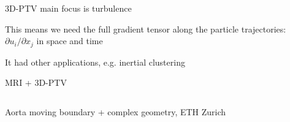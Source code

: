     
\begin{frame}[label=app-13]{3D-PTV main focus is turbulence}
    \begin{cardTiny} 
    This means we need  the \alert{full gradient tensor} along the particle trajectories:
    $\partial u_{i}/\partial x_{j}$ in space and time
    \end{cardTiny}
    \begin{multicols}{2}
    \centering
    \end{multicols}
    \end{frame}
    
    \begin{frame}[label=app-14]{It had other applications, e.g. inertial clustering}
    \centering{}
    \end{frame}
    
\begin{frame}[label=app-15]{MRI + 3D-PTV}
    \begin{columns}
        \centering{}
    \end{columns}
\end{frame}

\begin{frame}[label=app-4]{Aorta moving boundary + complex geometry, ETH Zurich}
\end{frame}
    
